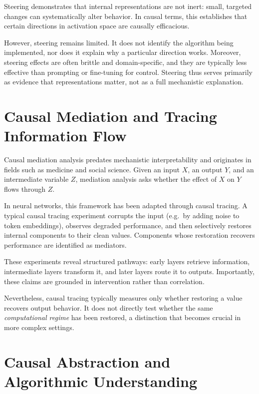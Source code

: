 \documentclass[11pt]{article}
\theoremstyle{remark}
\begin{document}
Steering demonstrates that internal representations are not inert: small, targeted changes can systematically alter behavior. In causal terms, this establishes that certain directions in activation space are causally efficacious.

However, steering remains limited. It does not identify the algorithm being implemented, nor does it explain why a particular direction works. Moreover, steering effects are often brittle and domain-specific, and they are typically less effective than prompting or fine-tuning for control. Steering thus serves primarily as evidence that representations matter, not as a full mechanistic explanation.

\section{Causal Mediation and Tracing Information Flow}

Causal mediation analysis predates mechanistic interpretability and originates in fields such as medicine and social science. Given an input $X$, an output $Y$, and an intermediate variable $Z$, mediation analysis asks whether the effect of $X$ on $Y$ flows through $Z$.

In neural networks, this framework has been adapted through causal tracing. A typical causal tracing experiment corrupts the input (e.g.\ by adding noise to token embeddings), observes degraded performance, and then selectively restores internal components to their clean values. Components whose restoration recovers performance are identified as mediators.

These experiments reveal structured pathways: early layers retrieve information, intermediate layers transform it, and later layers route it to outputs. Importantly, these claims are grounded in intervention rather than correlation.

Nevertheless, causal tracing typically measures only whether restoring a value recovers output behavior. It does not directly test whether the same \emph{computational regime} has been restored, a distinction that becomes crucial in more complex settings.

\section{Causal Abstraction and Algorithmic Understanding}
\end{document}
